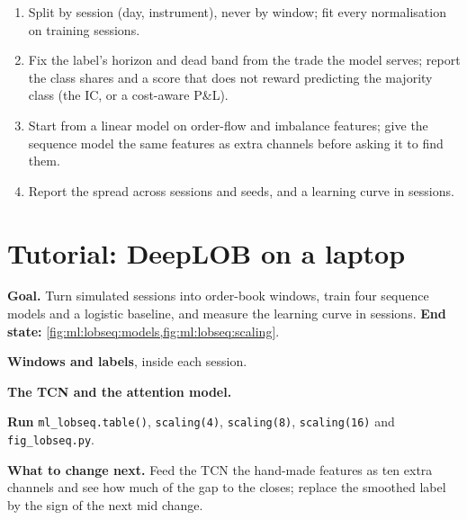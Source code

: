 \begin{method}\label{met:ml:lobseq:method}
\begin{enumerate}
\item Split by session (day, instrument), never by window; fit every normalisation on training sessions.
\item Fix the label's horizon and dead band from the trade the model serves; report the class shares and a score that
does not reward predicting the majority class (the IC, or a cost-aware P\&L).
\item Start from a linear model on order-flow and imbalance features; give the sequence model the same features as extra
channels before asking it to find them.
\item Report the spread across sessions and seeds, and a learning curve in sessions.
\end{enumerate}
\end{method}

\section{Tutorial: DeepLOB on a laptop}\label{tut:ml:sequence-models-on-order-books:tut}

\begin{tutorial}
\textbf{Goal.} Turn simulated sessions into order-book windows, train four sequence models and a logistic baseline, and
measure the learning curve in sessions. \textbf{End state:} \cref{fig:ml:lobseq:models,fig:ml:lobseq:scaling}.
\begin{tutsteps}
\item \textbf{Windows and labels}, inside each session.
\label{lst:ml:lobseq:windows}
\item \textbf{The TCN and the attention model.}
\label{lst:ml:lobseq:models}
\item \textbf{Run} \texttt{ml\_lobseq.table()}, \texttt{scaling(4)}, \texttt{scaling(8)}, \texttt{scaling(16)} and
\texttt{fig\_lobseq.py}.
\end{tutsteps}
\textbf{What to change next.} Feed the TCN the hand-made features as ten extra channels and see how much of the gap to the
 closes; replace the smoothed label by the sign of the next mid change.
\end{tutorial}

